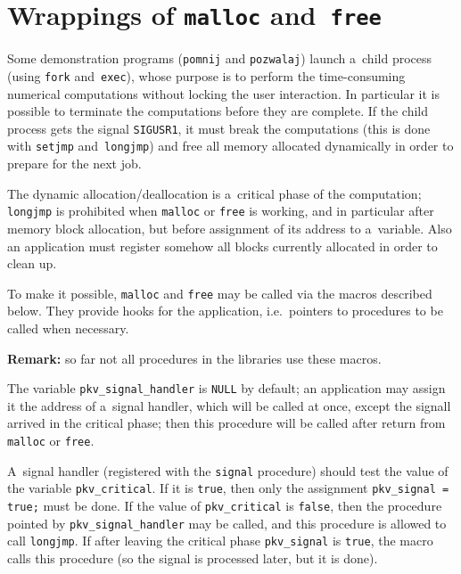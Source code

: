 \section{\label{sect:MALLOC:FREE}Wrappings of \texttt{malloc} and~\texttt{free}}

Some demonstration programs (\texttt{pomnij} and \texttt{pozwalaj})
launch a~child process (using \texttt{fork} and~\texttt{exec}), whose
purpose is to perform the time-consuming numerical computations without
locking the user interaction. In particular it is possible to terminate the
computations before they are complete. If the child process gets the signal
\texttt{SIGUSR1}, it must break the computations
(this is done with \texttt{setjmp} and~\texttt{longjmp}) and free all memory
allocated dynamically in order to prepare for the next job.

The dynamic allocation/deallocation is a~critical phase of the computation;
\texttt{longjmp} is prohibited when \texttt{malloc} or \texttt{free} is
working, and in particular after memory block allocation, but before
assignment of its address to a~variable. Also an application must
register somehow all blocks currently allocated in order to clean up.

To make it possible, \texttt{malloc} and \texttt{free} may be called via the
macros described below. They provide hooks for the application, i.e.\
pointers to procedures to be called when necessary.

\textbf{Remark:} so far not all procedures in the libraries use these
macros.

\vspace{\bigskipamount}
The variable \texttt{pkv\_signal\_handler} is \texttt{NULL} by default;
an application may assign it the address of a~signal handler, which will
be called at once, except the signall arrived in the critical phase;
then this procedure will be called after return from \texttt{malloc} or
\texttt{free}.

A~signal handler (registered with the \texttt{signal} procedure)
should test the value of the variable \texttt{pkv\_critical}.
If it is \texttt{true}, then only the assignment
\texttt{pkv\_signal = true;} must be done. If the value of \texttt{pkv\_critical}
is \texttt{false}, then the procedure pointed by
\texttt{pkv\_signal\_handler} may be called, and this procedure is allowed
to call \texttt{longjmp}.
If after leaving the critical phase \texttt{pkv\_signal}
is \texttt{true}, the macro calls this procedure (so the signal is processed
later, but it is done).

